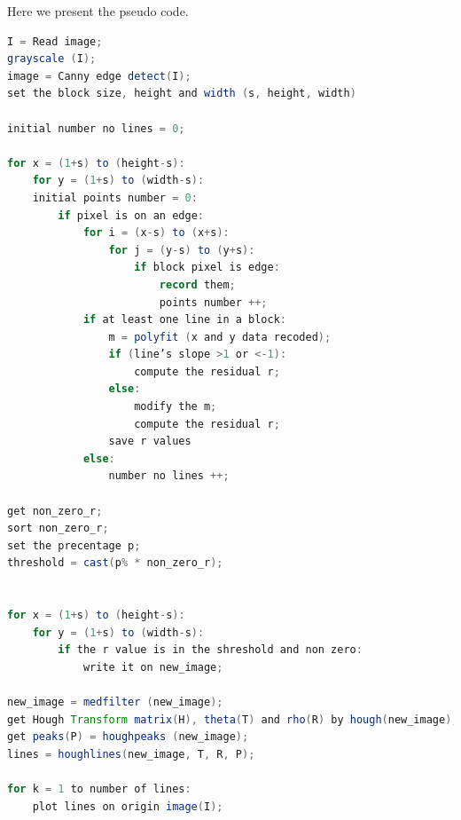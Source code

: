 Here we present the pseudo code.
\begin{lstlisting}[language=Java]
I = Read image;
grayscale (I);
image = Canny edge detect(I);
set the block size, height and width (s, height, width)
	
initial number no lines = 0;

for x = (1+s) to (height-s):
    for y = (1+s) to (width-s):
    initial points number = 0:
        if pixel is on an edge:
            for i = (x-s) to (x+s):
                for j = (y-s) to (y+s):
        	        if block pixel is edge:
                        record them;
                        points number ++;
        	if at least one line in a block:
        	    m = polyfit (x and y data recoded);
        	    if (line’s slope >1 or <-1):
        	        compute the residual r;
        	    else:
        	        modify the m;
        	        compute the residual r;
        	    save r values
        	else:
                number no lines ++;
                
get non_zero_r;
sort non_zero_r;	
set the precentage p;
threshold = cast(p% * non_zero_r);


for x = (1+s) to (height-s):
    for y = (1+s) to (width-s):
        if the r value is in the shreshold and non zero:
	        write it on new_image;
	        
new_image = medfilter (new_image);
get Hough Transform matrix(H), theta(T) and rho(R) by hough(new_image);
get peaks(P) = houghpeaks (new_image);
lines = houghlines(new_image, T, R, P);

for k = 1 to number of lines:
    plot lines on origin image(I);

\end{lstlisting}
